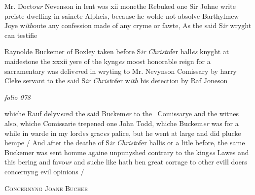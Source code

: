 \documentclass[12pt, a4paper]{book}
\begin{document}
		
		\ifthenelse{\isodd{\thepage}}
		{\reversemarginpar}
		{\normalmarginpar}
		Mr. Docto\textit{ur} Nevenson in lent was xii monethe
			Rebuked one Sir Johne write preiste dwelling
 in saincte Alpheis, because he wolde not absolve
			Barthylmew Joye w\textit{ith}oute any confession made
 of any cryme or fawte, As the said S\textit{ir} wryght
		can testifie
	
 
				\marginpar[\vspace{0.5cm}{\textcolor{Gray}{n}}]{}
			
 	
		\ifthenelse{\isodd{\thepage}}
		{\reversemarginpar}
		{\normalmarginpar}
		Raynolde Buckemer of Boxley taken before S\textit{ir}
                  \textit{Christ}ofer hall\textit{es} knyght at maidestone the xxxii
 yere of the kyng\textit{es} moost honorable reign for a
 		sacramentary was deliv\textit{er}ed in wryting to Mr.
 Nevynson Comissary by harry Cleke servant to
 		the said S\textit{ir}\textit{ Christ}ofer w\textit{ith} his detection by Raf Joneson



\dotfill
					

\textit{folio 078}



		\ifthenelse{\isodd{\thepage}}
		{\reversemarginpar}
		{\normalmarginpar}
		whiche Rauf delyv\textit{er}ed the said Buckem\textit{er} to the 
 Comissarye and the witnes also, whiche
 Comissarie trepened one John Todd, whiche
 Buckem\textit{er} was for a while in warde in my lord\textit{es}
 grac\textit{es} palice, but he went at large and did plucke
 hempe / And after the deathe of S\textit{ir}
                  \textit{Christ}ofer hallis
 or a litle before, the same Buckemer was sent homme
 againe unpunyshed contrary to the king\textit{es} Lawes
 and this bering and favo\textit{ur} and suche like hath ben
 great corrage to other evill doers concernyng evil
 opinions /
 

            
            

				\begin{center} \begin{large} {\scshape Concernyng Joane Bucher} \end{large} \end{center}
			
            	
            		
			
\end{document}
